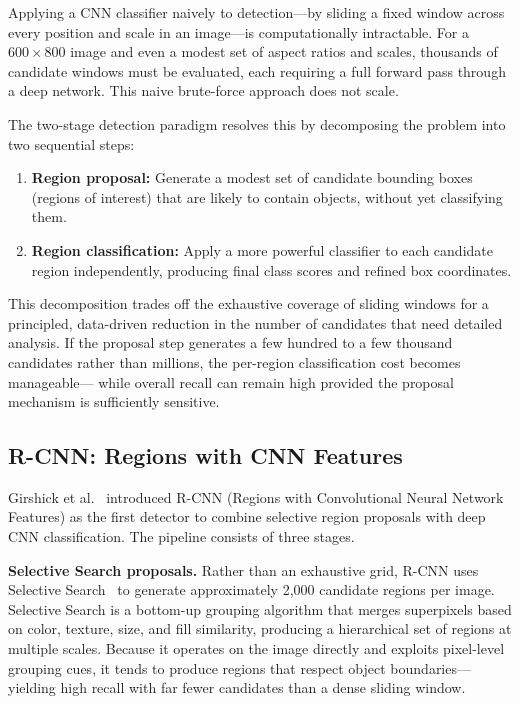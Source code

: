Applying a CNN classifier naively to detection---by sliding a
fixed window across every position and scale in an image---is
computationally intractable. For a $600 \times 800$ image and
even a modest set of aspect ratios and scales, thousands of
candidate windows must be evaluated, each requiring a full
forward pass through a deep network. This naive brute-force
approach does not scale.

The two-stage detection paradigm resolves this by decomposing
the problem into two sequential steps:

\begin{enumerate}
    \item \textbf{Region proposal:} Generate a modest set of
    candidate bounding boxes (regions of interest) that are
    likely to contain objects, without yet classifying them.
    \item \textbf{Region classification:} Apply a more powerful
    classifier to each candidate region independently, producing
    final class scores and refined box coordinates.
\end{enumerate}

This decomposition trades off the exhaustive coverage of sliding
windows for a principled, data-driven reduction in the number of
candidates that need detailed analysis. If the proposal step
generates a few hundred to a few thousand candidates rather than
millions, the per-region classification cost becomes manageable---
while overall recall can remain high provided the proposal
mechanism is sufficiently sensitive.

\subsection{R-CNN: Regions with CNN Features}

Girshick et al.~\cite{girshick2014rcnn} introduced R-CNN
(Regions with Convolutional Neural Network Features) as the first
detector to combine selective region proposals with deep CNN
classification. The pipeline consists of three stages.

\textbf{Selective Search proposals.}
Rather than an exhaustive grid, R-CNN uses Selective
Search~\cite{uijlings2013selective} to generate approximately
2,000 candidate regions per image. Selective Search is a
bottom-up grouping algorithm that merges superpixels based on
color, texture, size, and fill similarity, producing a
hierarchical set of regions at multiple scales. Because it
operates on the image directly and exploits pixel-level
grouping cues, it tends to produce regions that respect object
boundaries---yielding high recall with far fewer candidates than
a dense sliding window.

